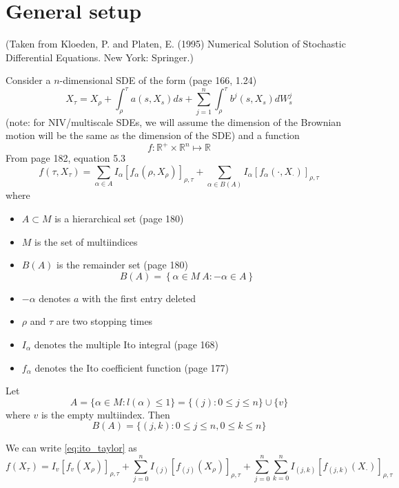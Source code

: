 \documentclass[12pt]{article}
\begin{document}
\section{General setup}

(Taken from Kloeden, P. and Platen, E. (1995) Numerical Solution of Stochastic Differential Equations. New York: Springer.)

Consider a $n$-dimensional SDE of the form (page 166, 1.24)
%
\begin{equation}
X_\tau = X_\rho + \int_\rho^\tau a(s, X_s) ds + \sum_{j=1}^n \int_\rho^\tau b^j (s, X_s) dW_s^j
\end{equation}
(note: for NIV/multiscale SDEs, we will assume the dimension of the Brownian motion will be the same as the dimension of the SDE)
%
and a function 
$$f: \mathbb{R}^{+} \times \mathbb{R}^n \mapsto \mathbb{R}$$
%
From page 182, equation 5.3
%
\begin{equation} \label{eq:ito_taylor}
f(\tau, X_\tau) = \sum_{\alpha \in A} I_\alpha [f_\alpha(\rho, X_\rho)]_{\rho, \tau} + \sum_{\alpha \in B(A)} I_\alpha [f_\alpha (\cdot, X_\cdot)]_{\rho, \tau}
\end{equation}
where 
\begin{itemize}
\item $A \subset M$ is a hierarchical set (page 180)
\item $M$ is the set of multiindices 
\item  $B(A)$ is the remainder set (page 180)
$$B(A) = \left\{ \alpha \in M \ A: -\alpha \in A \right\}$$
\item  $-\alpha$ denotes $a$ with the first entry deleted
\item $\rho$ and $\tau$ are two stopping times
\item $I_\alpha$ denotes the multiple Ito integral (page 168)
\item $f_\alpha$ denotes the Ito coefficient function (page 177)
\end{itemize}


Let 
$$ A = \{ \alpha \in M : l(\alpha) \le 1 \} = \{ (j) : 0 \le j \le n \} \cup \{v \}$$
where $v$ is the empty multiindex.
%
Then
$$B(A) = \{ (j, k) : 0 \le j \le n, 0 \le k \le n \}$$

We can write \eqref{eq:ito_taylor} as
\begin{equation} \label{eq:ito_taylor2}
f( X_\tau) = I_{v} [f_{v} ( X_\rho)]_{\rho, \tau} + \sum_{j=0}^n I_{(j)} [f_{(j)}( X_\rho)]_{\rho, \tau} + \sum_{j=0}^n \sum_{k=0}^n I_{(j,k)} [f_{(j,k)} ( X_\cdot)]_{\rho, \tau}
\end{equation}
\end{document}
